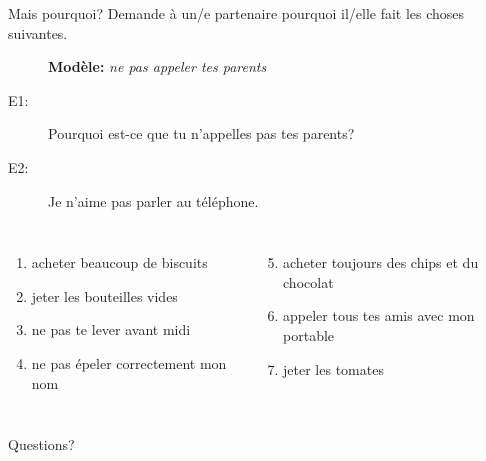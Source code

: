 \documentclass{beamer}
\begin{document}
  \begin{frame}{Mais pourquoi?}
    Demande à un/e partenaire pourquoi il/elle fait les choses suivantes. \\
    \begin{description}
      \item[] \textbf{Modèle:} \emph{ne pas appeler tes parents}
      \item[E1:] Pourquoi est-ce que tu n'appelles pas tes parents?
      \item[E2:] Je n'aime pas parler au téléphone.
    \end{description}
    \begin{columns}[t]
        \begin{enumerate}
          \item acheter beaucoup de biscuits
          \item jeter les bouteilles vides 
          \item ne pas te lever avant midi
          \item ne pas épeler correctement mon nom
        \end{enumerate}
        \begin{enumerate}
          \setcounter{enumi}{4}
          \item acheter toujours des chips et du chocolat
          \item appeler tous tes amis avec mon portable
          \item jeter les tomates
        \end{enumerate}
    \end{columns}
  \end{frame}

  \begin{frame}{}
    \begin{center}
      \Large Questions?
    \end{center}
  \end{frame}
\end{document}
